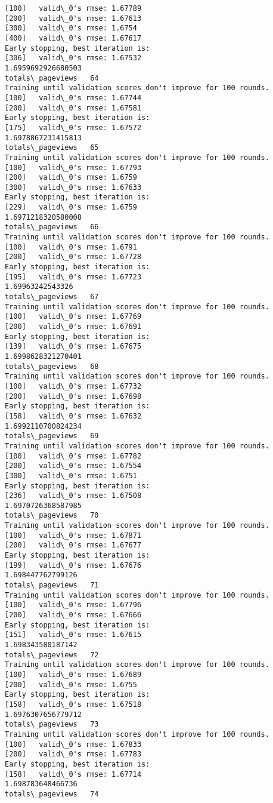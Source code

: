\documentclass[11pt]{article}
\begin{document}
\begin{Verbatim}[commandchars=\\\{\}]
[100]	valid\_0's rmse: 1.67789
[200]	valid\_0's rmse: 1.67613
[300]	valid\_0's rmse: 1.6754
[400]	valid\_0's rmse: 1.67617
Early stopping, best iteration is:
[306]	valid\_0's rmse: 1.67532
1.6959692926680503
totals\_pageviews   64
Training until validation scores don't improve for 100 rounds.
[100]	valid\_0's rmse: 1.67744
[200]	valid\_0's rmse: 1.67581
Early stopping, best iteration is:
[175]	valid\_0's rmse: 1.67572
1.6978867231415813
totals\_pageviews   65
Training until validation scores don't improve for 100 rounds.
[100]	valid\_0's rmse: 1.67793
[200]	valid\_0's rmse: 1.6759
[300]	valid\_0's rmse: 1.67633
Early stopping, best iteration is:
[229]	valid\_0's rmse: 1.6759
1.6971218320580008
totals\_pageviews   66
Training until validation scores don't improve for 100 rounds.
[100]	valid\_0's rmse: 1.6791
[200]	valid\_0's rmse: 1.67728
Early stopping, best iteration is:
[195]	valid\_0's rmse: 1.67723
1.69963242543326
totals\_pageviews   67
Training until validation scores don't improve for 100 rounds.
[100]	valid\_0's rmse: 1.67769
[200]	valid\_0's rmse: 1.67691
Early stopping, best iteration is:
[139]	valid\_0's rmse: 1.67675
1.6998628321270401
totals\_pageviews   68
Training until validation scores don't improve for 100 rounds.
[100]	valid\_0's rmse: 1.67732
[200]	valid\_0's rmse: 1.67698
Early stopping, best iteration is:
[158]	valid\_0's rmse: 1.67632
1.6992110700824234
totals\_pageviews   69
Training until validation scores don't improve for 100 rounds.
[100]	valid\_0's rmse: 1.67782
[200]	valid\_0's rmse: 1.67554
[300]	valid\_0's rmse: 1.6751
Early stopping, best iteration is:
[236]	valid\_0's rmse: 1.67508
1.6970726368587985
totals\_pageviews   70
Training until validation scores don't improve for 100 rounds.
[100]	valid\_0's rmse: 1.67871
[200]	valid\_0's rmse: 1.67677
Early stopping, best iteration is:
[199]	valid\_0's rmse: 1.67676
1.698447762799126
totals\_pageviews   71
Training until validation scores don't improve for 100 rounds.
[100]	valid\_0's rmse: 1.67796
[200]	valid\_0's rmse: 1.67666
Early stopping, best iteration is:
[151]	valid\_0's rmse: 1.67615
1.698343580187142
totals\_pageviews   72
Training until validation scores don't improve for 100 rounds.
[100]	valid\_0's rmse: 1.67689
[200]	valid\_0's rmse: 1.6755
Early stopping, best iteration is:
[158]	valid\_0's rmse: 1.67518
1.6976307656779712
totals\_pageviews   73
Training until validation scores don't improve for 100 rounds.
[100]	valid\_0's rmse: 1.67833
[200]	valid\_0's rmse: 1.67783
Early stopping, best iteration is:
[158]	valid\_0's rmse: 1.67714
1.698783648466736
totals\_pageviews   74

\end{Verbatim}
\end{document}
